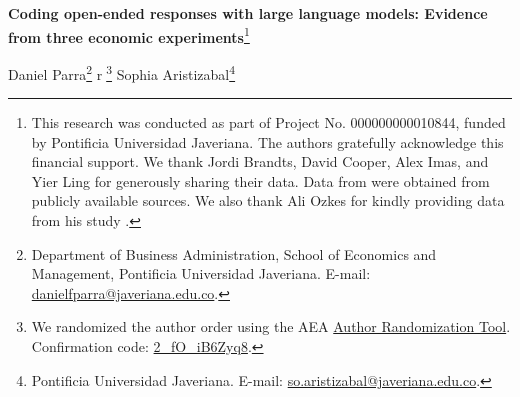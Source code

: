 \documentclass[11pt]{article}
\begin{document}
\begin{sloppypar}

\setcounter{page}{1} \thispagestyle{empty} \renewcommand{\thefootnote}{\fnsymbol{footnote}} %


\begin{center}
\vspace{+0.5cm}
\huge\textbf{Coding open-ended responses with large language models: Evidence from three economic experiments}\footnote{This research was conducted as part of Project No. 000000000010844, funded by Pontificia Universidad Javeriana. The authors gratefully acknowledge this financial support. We thank Jordi Brandts, David Cooper, Alex Imas, and Yier Ling for generously sharing their data. Data from \citet{ederer_schneider_2022} were obtained from publicly available sources. We also thank Ali Ozkes for kindly providing data from his study \citet{hanaki2023strategic}.
}

\vspace{+1cm}

\large{Daniel Parra}\footnote{Department of Business Administration, School of Economics and Management, Pontificia Universidad Javeriana. E-mail: \href{mailto:danielfparra@javeriana.edu.co}{danielfparra@javeriana.edu.co}.}
\hspace{0.5em} \textcircled{r}\footnote{We randomized the author order using the AEA \href{https://www.aeaweb.org/journals/policies/random-author-order/generator}{Author Randomization Tool}. Confirmation code: \href{https://www.aeaweb.org/journals/policies/random-author-order/search?RandomAuthorsSearch\%5Bsearch\%5D=2\_fO\_iB6Zyq8}{2\_fO\_iB6Zyq8}.} \hspace{0.3em}
\large{Sophia Aristizabal}\footnote{Pontificia Universidad Javeriana. E-mail: \href{mailto:so.aristizabal@javeriana.edu.co}{so.aristizabal@javeriana.edu.co}.}
\\
\end{center}

\bigskip
\begin{abstract}
\noindent
This paper studies whether large language models (LLMs) can replicate and scale the coding of open-ended responses and free-form communication in experimental economics. We assemble three empirical applications built from previously published communication datasets. The first involves inductively coded free-text explanations about self- and peer-reported AI use. The second involves multi-label human coding of free-form chat in a coordination experiment. The third uses communication from a trust game with promises over time. Across these cases, we compare LLM-generated labels to human-coded benchmarks, evaluate agreement and predictive validity, and study when LLM coders succeed or fail. Our goal is not only to assess whether LLMs can reproduce existing coding decisions, but also to identify which types of experimental text are best suited for reliable AI-assisted coding.
    

\end{abstract}
\end{sloppypar}
\end{document}
